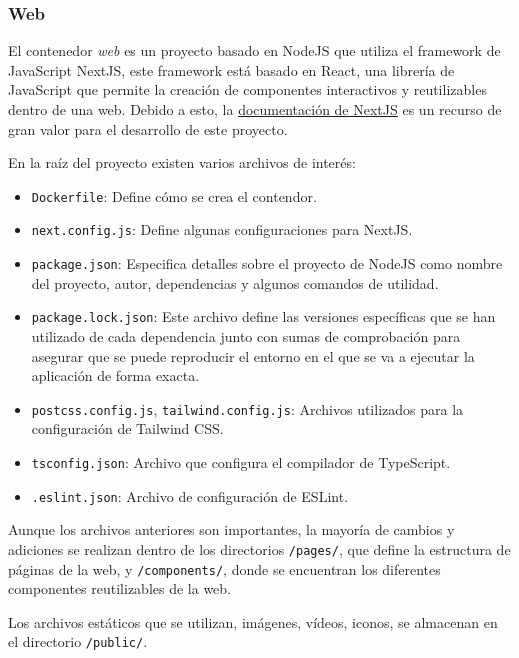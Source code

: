 \subsubsection{Web}

El contenedor \textit{web} es un proyecto basado en NodeJS que utiliza el
framework de JavaScript NextJS, este framework está basado en React, una
librería de JavaScript que permite la creación de componentes interactivos y
reutilizables dentro de una web. Debido a esto, la
\href{https://nextjs.org/docs/getting-started}{documentación de NextJS} es un
recurso de gran valor para el desarrollo de este proyecto.

En la raíz del proyecto existen varios archivos de interés:

\begin{itemize}
    \item \texttt{Dockerfile}: Define cómo se crea el contendor.
    \item \texttt{next.config.js}: Define algunas configuraciones para NextJS.
    \item \texttt{package.json}: Especifica detalles sobre el proyecto de NodeJS
          como nombre del proyecto, autor, dependencias y algunos comandos de
          utilidad.
    \item \texttt{package.lock.json}: Este archivo define las versiones
          específicas que se han utilizado de cada dependencia junto con sumas
          de comprobación para asegurar que se puede reproducir el entorno en el
          que se va a ejecutar la aplicación de forma exacta.
    \item \texttt{postcss.config.js}, \texttt{tailwind.config.js}: Archivos
          utilizados para la configuración de Tailwind CSS.
    \item \texttt{tsconfig.json}: Archivo que configura el compilador de
          TypeScript.
    \item \texttt{.eslint.json}: Archivo de configuración de ESLint.
\end{itemize}

Aunque los archivos anteriores son importantes, la mayoría de cambios y
adiciones se realizan dentro de los directorios \texttt{/pages/}, que define la
estructura de páginas de la web, y \texttt{/components/}, donde se encuentran
los diferentes componentes reutilizables de la web.

Los archivos estáticos que se utilizan, imágenes, vídeos, iconos, se almacenan
en el directorio \texttt{/public/}.

